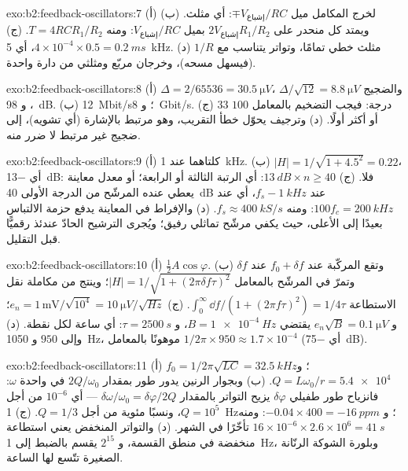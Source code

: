 \begin{solution}{exo:b2:feedback-oscillators:7}
(أ) لخرج المكامل ميل $\mp V_{\text{إشباع}}/RC$: أي مثلث. (ب)
ويمتد كل منحدر على $2V_{\text{إشباع}}R_1/R_2$ بميل $V_{\text{إشباع}}/RC$: ومنه $T = 4RCR_1/R_2$.
(ج) $4 \times 10^{-4} \times 0.5 = \qty{0.2}{ms}$، أي \qty{5}{kHz}. (د) مثلث خطي
تمامًا، وتواتر يتناسب مع $1/R$ (فيسهل مسحه)، وخرجان مربّع
ومثلثي من دارة واحدة.
\end{solution}

\begin{solution}{exo:b2:feedback-oscillators:8}
(أ) $\Delta = 2/65536 = \qty{30.5}{\micro V}$، والضجيج $\Delta/\sqrt{12} = \qty{8.8}{\micro V}$،
و \qty{98}{dB}. (ب) \qty{12}{Mbit/s}؛ و \qty{8}{Gbit/s}. (ج) $33$ درجة: فيجب التضخيم
بالمعامل $100$ أو أكثر أولًا. (د) وترجيف يحوّل خطأ التقريب، وهو مرتبط
بالإشارة (أي تشويه)، إلى ضجيج غير مرتبط لا ضرر منه.
\end{solution}

\begin{solution}{exo:b2:feedback-oscillators:9}
(أ) كلتاهما عند \qty{1}{kHz}. (ب) $|H| = 1/\sqrt{1 + 4.5^2} = 0.22$، أي \qty{-13}{dB}: فلا. (ج)
$\qty{13}{dB} \times n \ge 40$: أي الرتبة الثالثة أو الرابعة؛ أو معدل معاينة
يعطي عنده المرشّح من الدرجة الأولى \qty{40}{dB} عند $f_s - \qty{1}{kHz}$، أي عند
$100f_c = \qty{200}{kHz}$: ومنه $f_s \approx \qty{400}{kS/s}$. (د) والإفراط في المعاينة يدفع
حزمة الالتباس بعيدًا إلى الأعلى، حيث يكفي مرشّح تماثلي رفيق؛ ويُجرى
الترشيح الحادّ عندئذ رقميًّا قبل التقليل.
\end{solution}

\begin{solution}{exo:b2:feedback-oscillators:10}
(أ) $\tfrac12A\cos\varphi$. (ب) وتقع المركّبة عند $f_0 + \delta f$ عند $\delta f$
وتمرّ في المرشّح بالمعامل $|H| = 1/\sqrt{1 + (2\pi\delta f\tau)^2}$؛ وينتج من مكاملة
نقل الاستطاعة $\int_0^\infty\dd f/(1 + (2\pi f\tau)^2) = 1/4\tau$.
(ج) $e_n = 1\,\text{mV}/\sqrt{10^4} = \qty{10}{\micro V/\sqrt{Hz}}$؛ و $e_n\sqrt B = \qty{0.1}{\micro V}$
يقتضي $B = \qty{1e-4}{Hz}$، و $\tau = \qty{2500}{s}$: أي ساعة لكل نقطة. (د) وإلى $950$
و \qty{1050}{Hz}، موهونًا بالمعامل $1/2\pi \times 950 \approx 1.7 \times 10^{-4}$ (أي \qty{-75}{dB}).
\end{solution}

\begin{solution}{exo:b2:feedback-oscillators:11}
(أ) $f_0 = 1/2\pi\sqrt{LC} = \qty{32.5}{kHz}$؛ و $Q = L\omega_0/r = \qty{5.4e4}{}$. (ب) وبجوار
الرنين يدور طور  بمقدار $2Q/\omega_0$ في واحدة $\omega$: فانزياح
طور طفيلي $\delta\varphi$ يزيح التواتر بالمقدار $\delta\omega/\omega_0 =
\delta\varphi/2Q$ --- أي $10^{-6}$ من أجل $Q = 10^5$، ونسبًا مئوية من أجل $Q = 1/3$. (ج) \qty{1}{Hz}؛
و $-0.04 \times 400 = \qty{-16}{ppm}$: ومنه $16 \times 10^{-6} \times 2.6 \times 10^6 = \qty{41}{s}$ تأخّرًا في
الشهر. (د) والتواتر المنخفض يعني استطاعة منخفضة في منطق القسمة، و $2^{15}$
يقسم بالضبط إلى \qty{1}{Hz}، وبلورة الشوكة الرنّانة الصغيرة تتّسع لها
الساعة.
\end{solution}

